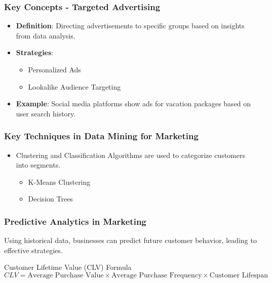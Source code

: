\documentclass[aspectratio=169]{beamer}
\begin{document}
\begin{frame}[fragile]
    \frametitle{Key Concepts - Targeted Advertising}
    \begin{itemize}
        \item \textbf{Definition}: Directing advertisements to specific groups based on insights from data analysis.
        \item \textbf{Strategies}:
        \begin{itemize}
            \item Personalized Ads
            \item Lookalike Audience Targeting
        \end{itemize}
        \item \textbf{Example}: Social media platforms show ads for vacation packages based on user search history.
    \end{itemize}
\end{frame}

\begin{frame}[fragile]
    \frametitle{Key Techniques in Data Mining for Marketing}
    \begin{itemize}
        \item Clustering and Classification Algorithms are used to categorize customers into segments.
        \begin{itemize}
            \item K-Means Clustering
            \item Decision Trees
        \end{itemize}
    \end{itemize}
\end{frame}

\begin{frame}[fragile]
    \frametitle{Predictive Analytics in Marketing}
    Using historical data, businesses can predict future customer behavior, leading to effective strategies.
    
    \begin{block}{Customer Lifetime Value (CLV) Formula}
        \begin{equation}
            CLV = \text{Average Purchase Value} \times \text{Average Purchase Frequency} \times \text{Customer Lifespan}
        \end{equation}
    \end{block}
\end{frame}
\end{document}
